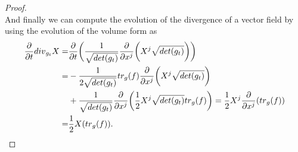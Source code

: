 \documentclass{amsart}
\theoremstyle{definition}
\theoremstyle{remark}
\newcommand{\tr}{{\rm tr}}
\begin{document}
\begin{proof}
$$$$
And finally we can compute the evolution of the divergence of a vector field by using the evolution of the volume form as
$$
\begin{aligned}
    \frac{\partial}{\partial t} {\rm div}_{g_t}X=& \frac{\partial}{\partial t} \bigg( \frac{1}{\sqrt{det(g_t)}}\frac{\partial}{\partial x^j}\bigg( X^j\sqrt{det(g_t)} \bigg)\bigg)\\
    =&-\frac{1}{2 \sqrt{det(g_t)}} tr_g(f)\frac{\partial}{\partial x^j}\bigg( X^j\sqrt{det(g_t)} \bigg)\\&+\frac{1}{\sqrt{det(g_t)}}\frac{\partial}{\partial x^j}\bigg(\frac{1}{2} X^j\sqrt{det(g_t)} \tr_g(f)\bigg)
    =\frac{1}{2}X^j\frac{\partial}{\partial x^j}(\tr_g(f))\\
    =&\frac{1}{2}X(\tr_g(f)).
\end{aligned}
$$    
\end{proof}
\end{document}
